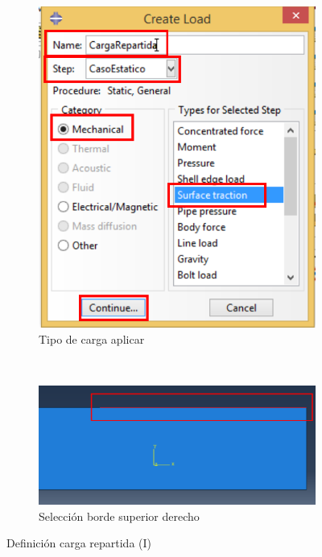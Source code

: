 \begin{enumerate}
\begin{figure}[H]
\begin{subfigure}{0.30\textwidth}
      \includegraphics[width=\textwidth]{./body/images/imagen44.pdf}
      \caption{Tipo de carga aplicar}
      \label{figu44}
    \end{subfigure}%
    ~ %
    \begin{subfigure}{0.44\textwidth}
      \includegraphics[width=\textwidth]{./body/images/imagen45.pdf}
      \caption{Selección borde superior derecho}
      \label{figu45}
    \end{subfigure}%
    \caption{Definición carga repartida (I)}

\end{figure}
\end{enumerate}
